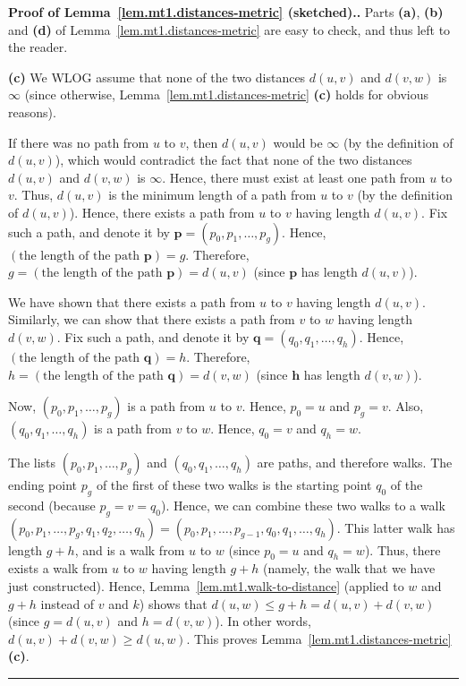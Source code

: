\documentclass[numbers=enddot,12pt,final,onecolumn,notitlepage]{scrartcl}%
\theoremstyle{definition}
\newenvironment{proof}[1][Proof]{\noindent\textbf{#1.} }{\ \rule{0.5em}{0.5em}}
\newcommand{\tup}[1]{\left( #1 \right)}
\begin{document}
\begin{proof}[Proof of Lemma~\ref{lem.mt1.distances-metric}
(sketched).]
Parts \textbf{(a)}, \textbf{(b)} and \textbf{(d)} of
Lemma~\ref{lem.mt1.distances-metric} are easy to check, and thus left
to the reader.

\textbf{(c)} We WLOG assume that none of the two distances
$d \tup{u, v}$ and $d \tup{v, w}$ is $\infty$ (since otherwise,
Lemma~\ref{lem.mt1.distances-metric} \textbf{(c)} holds for obvious
reasons).

If there was no path from $u$ to $v$, then $d \tup{u, v}$ would be
$\infty$ (by the definition of $d \tup{u, v}$), which would contradict
the fact that none of the two distances
$d \tup{u, v}$ and $d \tup{v, w}$ is $\infty$. Hence, there must exist
at least one path from $u$ to $v$. Thus,
$d \tup{u, v}$ is the minimum length of a path from $u$ to $v$ (by the
definition of $d \tup{u, v}$). Hence, there exists a path from $u$ to
$v$ having length $d \tup{u, v}$. Fix such a path, and denote it by
$\mathbf{p} = \tup{p_0, p_1, \ldots, p_g}$. Hence,
$\tup{\text{the length of the path } \mathbf{p}} = g$. Therefore,
$g = \tup{\text{the length of the path } \mathbf{p}} = d \tup{u, v}$
(since $\mathbf{p}$ has length $d \tup{u, v}$).

We have shown that there exists a path from $u$ to
$v$ having length $d \tup{u, v}$. Similarly, we can show that there
exists a path from $v$ to $w$ having length $d \tup{v, w}$. Fix such
a path, and denote it by
$\mathbf{q} = \tup{q_0, q_1, \ldots, q_h}$. Hence,
$\tup{\text{the length of the path } \mathbf{q}} = h$. Therefore,
$h = \tup{\text{the length of the path } \mathbf{q}} = d \tup{v, w}$
(since $\mathbf{h}$ has length $d \tup{v, w}$).

Now, $\tup{p_0, p_1, \ldots, p_g}$ is a path from $u$ to $v$. Hence,
$p_0 = u$ and $p_g = v$.
Also, $\tup{q_0, q_1, \ldots, q_h}$ is a path from $v$ to $w$. Hence,
$q_0 = v$ and $q_h = w$.

The lists $\tup{p_0, p_1, \ldots, p_g}$ and
$\tup{q_0, q_1, \ldots, q_h}$ are paths, and therefore walks. The
ending point $p_g$ of the first of these two walks is the starting
point $q_0$ of the second (because $p_g = v = q_0$).
Hence, we can combine these two walks to a walk
$\tup{p_0, p_1, \ldots, p_g, q_1, q_2, \ldots, q_h}
= \tup{p_0, p_1, \ldots, p_{g-1}, q_0, q_1, \ldots, q_h}$. This latter
walk has length $g + h$, and is a walk from $u$ to $w$ (since
$p_0 = u$ and $q_h = w$). Thus, there exists a walk from $u$ to $w$
having length $g + h$ (namely, the walk that we have just
constructed). Hence,
Lemma~\ref{lem.mt1.walk-to-distance} (applied to $w$ and $g + h$
instead of $v$ and $k$) shows that $d \tup{u, w} \leq g + h
= d \tup{u, v} + d \tup{v, w}$ (since $g = d \tup{u, v}$ and
$h = d \tup{v, w}$). In other words,
$d \tup{u, v} + d \tup{v, w} \geq d \tup{u, w}$.
This proves Lemma~\ref{lem.mt1.distances-metric} \textbf{(c)}.
\end{proof}
\end{document}
